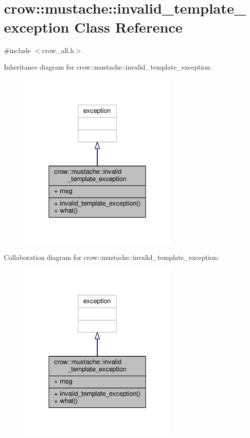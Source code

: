 \hypertarget{classcrow_1_1mustache_1_1invalid__template__exception}{\section{crow\-:\-:mustache\-:\-:invalid\-\_\-template\-\_\-exception Class Reference}
\label{classcrow_1_1mustache_1_1invalid__template__exception}
}


{\ttfamily \#include $<$crow\-\_\-all.\-h$>$}



Inheritance diagram for crow\-:\-:mustache\-:\-:invalid\-\_\-template\-\_\-exception\-:
\nopagebreak
\begin{figure}[H]
\begin{center}
\leavevmode
\includegraphics[width=228pt]{classcrow_1_1mustache_1_1invalid__template__exception__inherit__graph}
\end{center}
\end{figure}


Collaboration diagram for crow\-:\-:mustache\-:\-:invalid\-\_\-template\-\_\-exception\-:
\nopagebreak
\begin{figure}[H]
\begin{center}
\leavevmode
\includegraphics[width=228pt]{classcrow_1_1mustache_1_1invalid__template__exception__coll__graph}
\end{center}
\end{figure}
